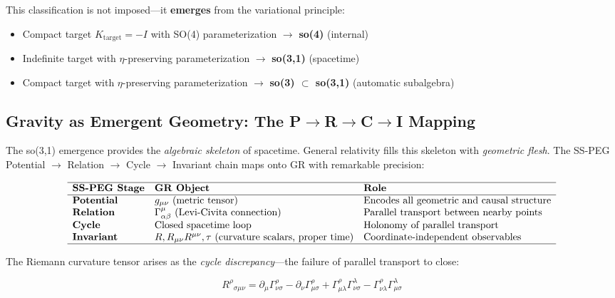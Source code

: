 This classification is not imposed---it \textbf{emerges} from the variational principle:
\begin{itemize}
\item Compact target $K_{\mathrm{target}} = -I$ with SO(4) parameterization $\to$ \textbf{so(4)} (internal)
\item Indefinite target with $\eta$-preserving parameterization $\to$ \textbf{so(3,1)} (spacetime)
\item Compact target with $\eta$-preserving parameterization $\to$ \textbf{so(3) $\subset$ so(3,1)} (automatic subalgebra)
\end{itemize}

\subsection{Gravity as Emergent Geometry: The P$\to$R$\to$C$\to$I Mapping}\label{sec:gravity_prci}

The so(3,1) emergence provides the \textit{algebraic skeleton} of spacetime. General relativity fills this skeleton with \textit{geometric flesh}. The SS-PEG Potential $\to$ Relation $\to$ Cycle $\to$ Invariant chain maps onto GR with remarkable precision:

\begin{equation}
\begin{array}{lll}
\hline
\textbf{SS-PEG Stage} & \textbf{GR Object} & \textbf{Role} \\
\hline
\textbf{Potential} & g_{\mu\nu} \text{ (metric tensor)} & \text{Encodes all geometric and causal structure} \\
\textbf{Relation} & \Gamma^\mu_{\alpha\beta} \text{ (Levi-Civita connection)} & \text{Parallel transport between nearby points} \\
\textbf{Cycle} & \text{Closed spacetime loop} & \text{Holonomy of parallel transport} \\
\textbf{Invariant} & R, R_{\mu\nu}R^{\mu\nu}, \tau \text{ (curvature scalars, proper time)} & \text{Coordinate-independent observables} \\
\hline
\end{array}
\end{equation}

The Riemann curvature tensor arises as the \textit{cycle discrepancy}---the failure of parallel transport to close:

\begin{equation}
R^\rho{}_{\sigma\mu\nu} = \partial_\mu \Gamma^\rho_{\nu\sigma} - \partial_\nu \Gamma^\rho_{\mu\sigma} + \Gamma^\rho_{\mu\lambda}\Gamma^\lambda_{\nu\sigma} - \Gamma^\rho_{\nu\lambda}\Gamma^\lambda_{\mu\sigma}
\end{equation}

